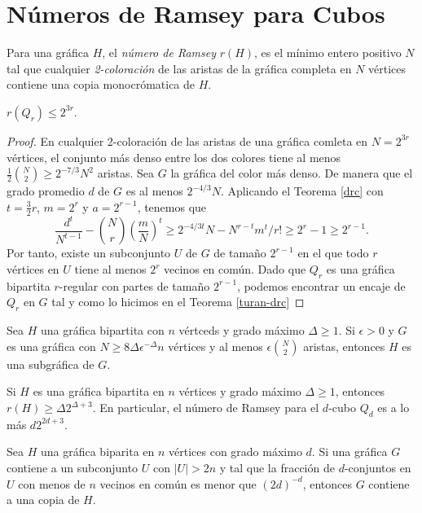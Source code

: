   \section{Números de Ramsey para Cubos}
  Para una gráfica $H$, el \textit{número de Ramsey} $r(H)$, es el
  mínimo entero positivo $N$ tal que cualquier \textit{2-coloración}
  de las aristas de la gráfica completa en $N$ vértices contiene una
  copia monocrómatica de $H$.
  \begin{theorem}
    $r(Q_r) \leq 2^{3r}$.
  \end{theorem}
  \begin{proof}
    En cualquier 2-coloración de las aristas de una gráfica comleta
    en $N = 2^{3r}$ vértices, el conjunto más denso entre los dos
    colores tiene al menos
    $\frac{1}{2} \binom{N}{2} \geq 2^{-7/3} N^2$ aristas. Sea $G$ la gráfica
    del color más denso. De manera que el grado promedio $d$ de $G$
    es al menos $2^{-4/3}N$. Aplicando el Teorema \ref{drc} con $t =
    \frac{3}{2}r$, $m = 2^r$ y $a = 2^{r-1}$, tenemos que
    $$\frac{d^t}{N^{t-1}} - \binom{N}{r} \left(\frac{m}{N}\right)^t
    \geq 2^{-4/3 t} N - N^{r-t}m^t / r! \geq 2^r - 1 \geq 2^{r-1}. $$
    Por tanto, existe un subconjunto $U$ de $G$ de tamaño $2^{r-1}$
    en el que todo $r$ vértices en $U$ tiene al menos $2^r$ vecinos en común.
    Dado que $Q_r$ es una gráfica bipartita $r$-regular con partes de
    tamaño $2^{r-1}$, podemos encontrar un encaje de $Q_r$ en $G$ tal
    y como lo hicimos en el Teorema \ref{turan-drc}
  \end{proof}

  \begin{theorem}
    Sea $H$ una gráfica bipartita con $n$ vértceds y grado máximo
    $\Delta \ge 1$.
    Si $\epsilon > 0$ y $G$ es una gráfica con $N \ge 8\Delta
    \epsilon^{-\Delta}n$
    vértices y al menos $\epsilon \binom{N}{2}$ aristas, entonces $H$
    es una subgráfica
    de $G$.
  \end{theorem}

  \begin{corollary}
    Si $H$ es una gráfica bipartita en $n$ vértices y grado máximo
    $\Delta \ge 1$, entonces $r(H) \ge \Delta 2^{\Delta + 3}$. En particular,
    el número de Ramsey para el $d$-cubo $Q_d$ es a lo más $d 2^{2d + 3}$.
  \end{corollary}

  \begin{theorem}
    Sea $H$ una gráfica biparita en $n$ vértices con grado máximo
    $d$. Si una gráfica $G$ contiene a un subconjunto $U$ con $\vert
    U \vert > 2n$ y tal que la fracción de $d$-conjuntos en $U$ con
    menos de $n$ vecinos en común es menor que $(2d)^{-d}$, entonces
    $G$ contiene a una copia de $H$.
  \end{theorem}


